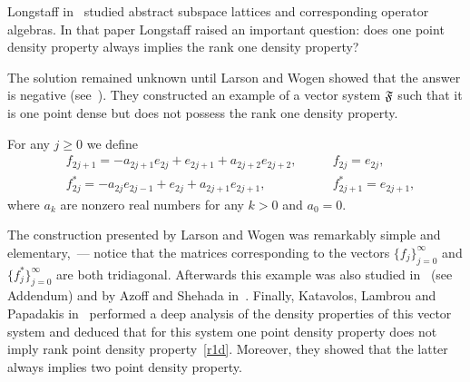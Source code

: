 \documentclass[12pt]{amsart}
\theoremstyle{case}
\begin{document}

    Long\-staff in~\cite{longstaff} studied abstract subspace lattices and corresponding operator algebras.
    In that paper Longstaff raised an important question: does one point density property always implies the rank one density property?

    The solution remained unknown until Larson and Wogen showed that the answer is negative (see~\cite{larson}).
    They constructed an example of a vector system $\mathfrak{F}$ such that it is one point dense but does not possess the rank one density property.
    \begin{example}
      \label{lw-sys}
      For any $j \geq 0$ we define
      \begin{align*}
        &f_{2j+1}=-a_{2j+1}e_{2j} + e_{2j+1} + a_{2j+2}e_{2j+2}, \qquad &f_{2j}=e_{2j},\\
        &f^*_{2j}=-a_{2j}e_{2j-1} + e_{2j} + a_{2j+1}e_{2j+1}, \qquad &f^*_{2j+1}=e_{2j+1},
      \end{align*}
      where $a_k$ are nonzero real numbers for any $k > 0$ and $a_0 = 0$.
    \end{example}
    The construction presented by Larson and Wogen was remarkably simple and elementary,~--- notice that the matrices corresponding to
      the vectors $\{f_j\}_{j=0}^\infty$ and $\{f^*_j\}_{j=0}^\infty$ are both tridiagonal.
    Afterwards this example was also studied in~\cite{argyroslambrou} (see Addendum) and by Azoff and Shehada in~\cite{azoff}.
    Finally, Katavolos, Lambrou and Papadakis in~\cite{katavolos} performed a deep analysis of the density properties
      of this vector system and deduced that for this system one point density property does not imply rank point density property~\ref{r1d}.
    Moreover, they showed that the latter always implies two point density property.
\end{document}
